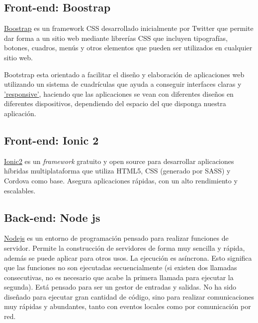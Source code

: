 \subsection{Front-end: Boostrap}\label{tecnologias_boostrap}
\hyperlink{https://www.getbootstrap.com/}{Boostrap} es un framework CSS desarrollado inicialmente  por Twitter que permite dar forma a un sitio web mediante librerías CSS que incluyen tipografías, botones, cuadros, menús y otros elementos que pueden ser utilizados en cualquier sitio web.

Bootstrap esta orientado a facilitar el diseño y elaboración de aplicaciones web utilizando un sistema de cuadrículas que ayuda a conseguir interfaces claras y  \hyperlink{https://es.wikipedia.org/wiki/Diseño_web_adaptable}{'responsive'}, haciendo que las aplicaciones se vean con diferentes diseños en diferentes dispositivos, dependiendo del espacio del que disponga nuestra aplicación.

\subsection{Front-end: Ionic 2}\label{tecnologias_ionic2}
\hyperlink{https://ionicframework.com/}{Ionic2} es un \emph{framework} gratuito y open source para desarrollar aplicaciones híbridas multiplataforma que utiliza HTML5, CSS (generado por SASS) y Cordova como base. Asegura aplicaciones rápidas, con un alto rendimiento y escalables.


\subsection{Back-end: Node js}\label{tecnologias_nodejs}
\hyperlink{https://nodejs.org/}{Nodejs} es un entorno de programación pensado para realizar funciones de servidor. Permite la construcción de servidores de forma muy sencilla y rápida, además se puede aplicar para otros usos. La ejecución es asíncrona. Esto significa que las funciones no son ejecutadas secuencialmente (si existen dos llamadas consecutivas, no es necesario que acabe la primera llamada para ejecutar la segunda).
Está pensado para ser un gestor de entradas y salidas. No ha sido diseñado para ejecutar gran cantidad de código, sino para realizar comunicaciones muy rápidas y abundantes, tanto con eventos locales como por comunicación por red.

